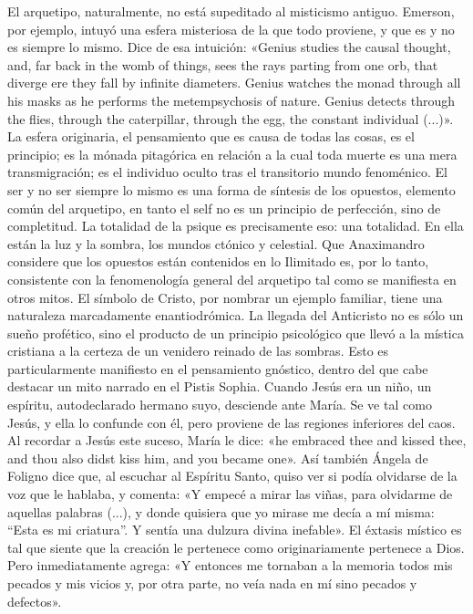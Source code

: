 \documentclass[a4paper]{article}
\begin{document}
El arquetipo, naturalmente, no está supeditado al misticismo antiguo. Emerson,
por ejemplo, intuyó una esfera misteriosa de la que todo proviene, y que es y no
es siempre lo mismo. Dice de esa intuición: «Genius studies the causal thought,
and, far back in the womb of things, sees the rays parting from one orb, that
diverge ere they fall by infinite diameters. Genius watches the monad through
all his masks as he performs the metempsychosis of nature. Genius detects
through the flies, through the caterpillar, through the egg, the constant
individual (...)». La esfera originaria, el pensamiento que es causa de todas
las cosas, es el principio; es la mónada pitagórica en relación a la cual toda
muerte es una mera transmigración; es el individuo oculto tras el transitorio
mundo fenoménico. El ser y no ser siempre lo mismo es una forma de síntesis de
los opuestos, elemento común del arquetipo, en tanto el self no es un principio
de perfección, sino de completitud. La totalidad de la psique es precisamente
eso: una totalidad. En ella están la luz y la sombra, los mundos ctónico y
celestial. Que Anaximandro considere que los opuestos están contenidos en lo
Ilimitado es, por lo tanto, consistente con la fenomenología general del
arquetipo tal como se manifiesta en otros mitos. El símbolo de Cristo, por
nombrar un ejemplo familiar, tiene una naturaleza marcadamente enantiodrómica.
La llegada del Anticristo no es sólo un sueño profético, sino el producto de un
principio psicológico que llevó a la mística cristiana a la certeza de un
venidero reinado de las sombras. Esto es particularmente manifiesto en el
pensamiento gnóstico, dentro del que cabe destacar un mito narrado en el Pistis
Sophia. Cuando Jesús era un niño, un espíritu, autodeclarado hermano suyo,
desciende ante María. Se ve tal como Jesús, y ella lo confunde con él, pero
proviene de las regiones inferiores del caos. Al recordar a Jesús este suceso,
María le dice: «he embraced thee and kissed thee, and thou also didst kiss him,
and you became one». Así también Ángela de Foligno dice que, al escuchar al
Espíritu Santo, quiso ver si podía olvidarse de la voz que le hablaba, y
comenta: «Y empecé a mirar las viñas, para olvidarme de aquellas palabras (...),
y donde quisiera que yo mirase me decía a mí misma: “Esta es mi criatura”. Y
sentía una dulzura divina inefable». El éxtasis místico es tal que siente que la
creación le pertenece como originariamente pertenece a Dios. Pero inmediatamente
agrega: «Y entonces me tornaban a la memoria todos mis pecados y mis vicios y,
por otra parte, no veía nada en mí sino pecados y defectos».
\end{document}
